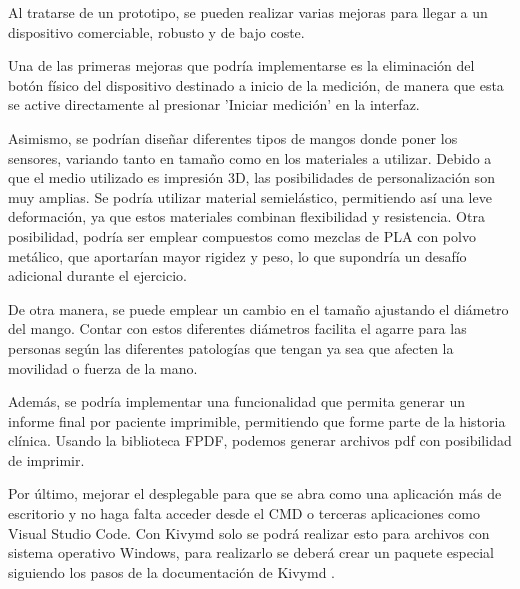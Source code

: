 Al tratarse de un prototipo, se pueden realizar varias mejoras para llegar a un dispositivo comerciable, robusto y de bajo coste.

Una de las primeras mejoras que podría implementarse es la eliminación del botón físico del dispositivo destinado a inicio de la medición, de manera que esta se active directamente al presionar 'Iniciar medición' en la interfaz. 

Asimismo, se podrían diseñar diferentes tipos de mangos donde poner los sensores, variando tanto en tamaño como en los materiales a utilizar. Debido a que el medio utilizado es impresión 3D, las posibilidades de personalización son muy amplias. Se podría utilizar material semielástico, permitiendo así una leve deformación, ya que estos materiales combinan flexibilidad y resistencia. Otra posibilidad, podría ser emplear compuestos como mezclas de PLA con polvo metálico, que aportarían mayor rigidez y peso, lo que supondría un desafío adicional durante el ejercicio.

De otra manera, se puede emplear un cambio en el tamaño ajustando el diámetro del mango. Contar con estos diferentes diámetros facilita el agarre para las personas según las diferentes patologías que tengan ya sea que afecten la movilidad o fuerza de la mano.

Además, se podría implementar una funcionalidad que permita generar un informe final por paciente imprimible, permitiendo que forme parte de la historia clínica. Usando la biblioteca FPDF, podemos generar archivos pdf con posibilidad de imprimir.

Por último, mejorar el desplegable para que se abra como una aplicación más de escritorio y no haga falta acceder desde el CMD o terceras aplicaciones como Visual Studio Code.
Con Kivymd solo se podrá realizar esto para archivos con sistema operativo Windows, para realizarlo se deberá crear un paquete especial siguiendo los pasos de la documentación de Kivymd \cite{kivymdapp}.
